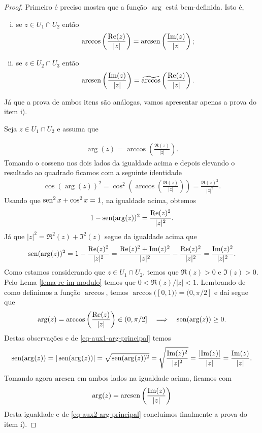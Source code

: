 \begin{proof}
Primeiro é preciso mostra que a função $\arg$ está bem-definida. Isto é,

\begin{enumerate}[i)]
\item se $z\in U_1\cap U_2$ então 
\[
\arccos\left( \displaystyle\frac{\mathrm{Re}(z)}{|z|} \right)
=
\operatorname{arcsen}\left( \displaystyle\frac{\mathrm{Im}(z)}{|z|} \right);
\]

\item se $z\in U_2\cap U_3$ então 
\[
\operatorname{arcsen}\left( \displaystyle\frac{\mathrm{Im}(z)}{|z|} \right)
=
\widetilde{\arccos}\left( \displaystyle\frac{\mathrm{Re}(z)}{|z|} \right).
\]
\end{enumerate}

Já que a prova de ambos itens são análogas, vamos apresentar apenas a
prova do item i).

Seja $z\in U_1\cap U_2$ e assuma que 

\begin{align}\label{eq-aux2-arg-principal}
\arg(z) 
=
\arccos\left( \displaystyle\frac{\Re(z)}{|z|} \right).
\end{align}
Tomando o cosseno nos dois lados da igualdade acima e depois elevando o resultado ao quadrado 
ficamos com a seguinte identidade
\begin{align*}
\cos(\arg(z))^2
=
\cos^2 \left(  \arccos\left( \displaystyle\frac{\Re(z)}{|z|} \right) \right)
=
\frac{\Re(z)^2}{|z|^2}.
\end{align*}
Usando que $\operatorname{sen}^{2}x+\cos^{2}x=1$, na igualdade acima, obtemos
\begin{align*}
1-\operatorname{sen}(\arg(z))^2 = \frac{\mathrm{Re}(z)^2}{|z|^2}.
\end{align*}
Já que $|z|^2= \Re^2(z)+\Im^2(z)$ segue da igualdade acima que
\begin{align}\label{eq-aux1-arg-principal}
\operatorname{sen}(\arg(z))^2 
= 1 - \frac{\mathrm{Re}(z)^2}{|z|^2} 
= \frac{\mathrm{Re}(z)^2+\mathrm{Im}(z)^2}{|z|^2}-\frac{\mathrm{Re}(z)^2}{|z|^2}
= \frac{\mathrm{Im}(z)^2}{|z|^2}.
\end{align}
Como estamos considerando que $z\in U_1\cap U_2$, temos que $\Re(z)>0$ e $\Im(z)>0$. 
Pelo Lema \ref{lema-re-im-modulo} temos que $0<\Re(z)/|z|<1$.
Lembrando de como definimos a função $\arccos$, temos 
$\arccos([0,1))=(0,\pi/2]$ e daí segue que 
\[
\arg(z) 
=
\arccos\left( \displaystyle\frac{\mathrm{Re}(z)}{|z|} \right)
\in 
(0,\pi/2]
\quad \Longrightarrow\quad 
\operatorname{sen}(\arg(z))\geq 0.
\]
Destas observações e  de \eqref{eq-aux1-arg-principal}
temos
\[
\operatorname{sen}(\arg(z))
=
|\operatorname{sen}(\arg(z))|
=
\sqrt{\operatorname{sen}(\arg(z))^2}
=
\sqrt{
\frac{\mathrm{Im}(z)^2}{|z|^2}
}
=
\frac{|\mathrm{Im}(z)|}{|z|}
=
\frac{\mathrm{Im}(z)}{|z|}.
\]
Tomando agora $\operatorname{arcsen}$ em ambos lados na igualdade acima, ficamos com
\[
\arg(z) = \operatorname{arcsen}\left( \displaystyle\frac{\mathrm{Im}(z)}{|z|} \right)
\]
Desta igualdade e de \eqref{eq-aux2-arg-principal} 
concluímos finalmente a prova do item i).



\end{proof}
